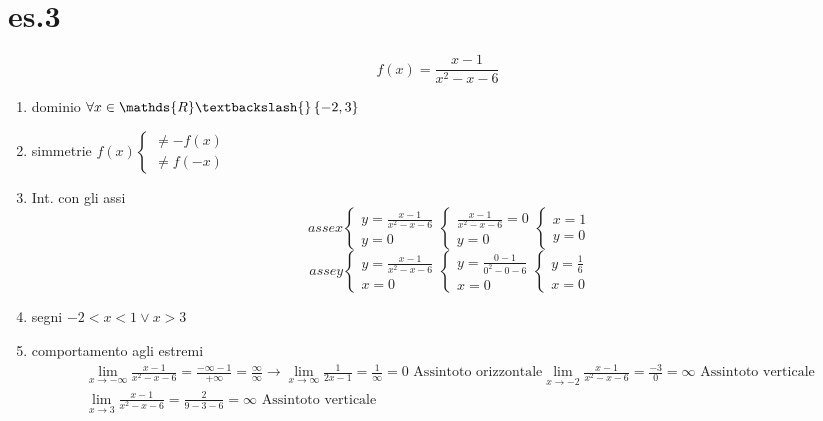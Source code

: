 \documentclass{article}
\begin{document}
	\section{es.3}
		\begin{equation*}
			f(x)=\frac{x-1}{x^2-x-6}
		\end{equation*}
		\begin{enumerate}
			\item dominio $\forall x\in \mathds{R}\textbackslash{}\left\{-2,3\right\}$
			\item simmetrie $f(x)\begin{cases}
				\neq -f(x)\\
				\neq f(-x)
			\end{cases}$
			\item Int. con gli assi
				\begin{equation*}
					asse x\begin{cases}
						y=\frac{x-1}{x^2-x-6}\\
						y=0
					\end{cases}\begin{cases}
						\frac{x-1}{x^2-x-6}=0\\
						y=0
					\end{cases}\begin{cases}
						x=1\\
						y=0
					\end{cases}
				\end{equation*}
				\begin{equation*}
					asse y\begin{cases}
						y=\frac{x-1}{x^2-x-6}\\
						x=0
					\end{cases}\begin{cases}
						y=\frac{0-1}{0^2-0-6}\\
						x=0
					\end{cases}\begin{cases}
						y=\frac{1}{6}\\
						x=0
					\end{cases}
				\end{equation*}
			\item segni $-2<x<1\vee x>3$
			\item comportamento agli estremi
				\begin{equation}
					\begin{matrix}
						\lim_{x\to
						-\infty}\frac{x-1}{x^2-x-6}=\frac{-\infty-1}{+\infty}=\frac{\infty}{\infty}
						\to \lim_{x\to\infty}\frac{1}{2x-1}=\frac{1}{\infty}=0 \text{ Assintoto orizzontale}
						\lim_{x\to -2}\frac{x-1}{x^2-x-6}=\frac{-3}{0}=\infty \text{ Assintoto verticale}\\
						\lim_{x\to 3}
						\frac{x-1}{x^2-x-6}=\frac{2}{9-3-6}=\infty \text{ Assintoto verticale}
					\end{matrix}
				\end{equation}
		\end{enumerate}
\end{document}
